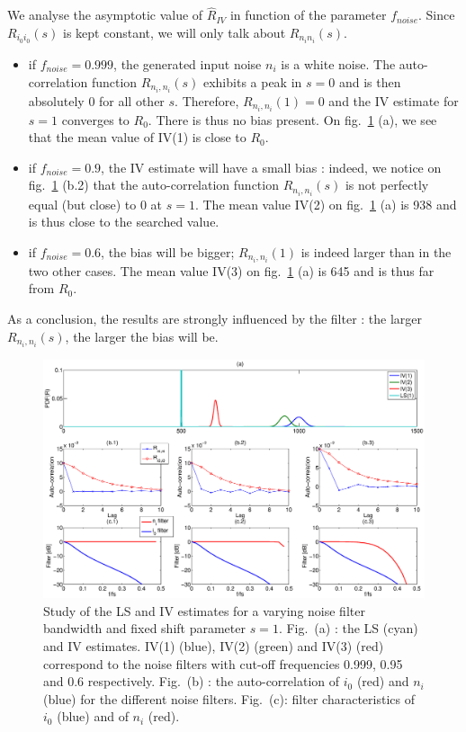 We analyse the asymptotic value of $\hat{R}_{IV}$ in function of the parameter $f_{noise}$. Since $R_{i_0 i_0}(s)$ is kept constant, we will only talk about $R_{n_i n_i}(s)$.
\begin{itemize}
    \item if $f_{noise} = 0.999$, the generated input noise $n_i$ is a white noise. The auto-correlation function $R_{n_i,n_i}(s)$ exhibits a peak in $s = 0$ and is then absolutely 0 for all other $s$. Therefore, $R_{n_i,n_i}(1) = 0$ and the IV estimate for $s = 1$ converges to $R_0$. There is thus no bias present. On fig.~\ref{Sess1_part1_exp1} (a), we see that the mean value of IV(1) is close to $R_0$.
    \item if $f_{noise} = 0.9$, the IV estimate will have a small bias : indeed, we notice on fig.~\ref{Sess1_part1_exp1} (b.2) that the auto-correlation function $R_{n_i,n_i}(s)$ is not perfectly equal (but close) to 0 at $s=1$. The mean value IV(2) on fig.~\ref{Sess1_part1_exp1} (a) is 938 and is thus close to the searched value.
    \item if $f_{noise} = 0.6$, the bias will be bigger; $R_{n_i,n_i}(1)$ is indeed larger than in the two other cases. The mean value IV(3) on fig.~\ref{Sess1_part1_exp1} (a) is 645 and is thus far from $R_0$.
\end{itemize}

As a conclusion, the results are strongly influenced by the filter : the larger $R_{n_i,n_i}(s)$, the larger the bias will be.
\begin{figure}[h!]
    \centering
    \includegraphics[width=1\textwidth]{Figures/Sess1_part1_exp1.eps}
    \caption{Study of the LS and IV estimates for a varying noise filter bandwidth and fixed shift parameter $s = 1$. Fig.~(a) : the LS (cyan) and IV estimates. IV(1) (blue), IV(2) (green) and IV(3) (red) correspond to the noise filters with cut-off frequencies 0.999, 0.95 and 0.6 respectively. Fig.~(b) : the auto-correlation of $i_0$ (red) and $n_i$ (blue) for the different noise filters. Fig.~(c): filter characteristics of $i_0$ (blue) and of $n_i$ (red).}
    \label{Sess1_part1_exp1}
\end{figure}

